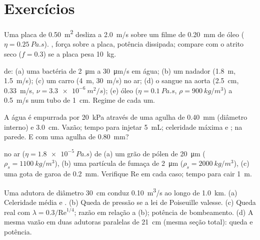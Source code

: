 \section{Exercícios}

\begin{exercise}[$\star$]\label{exo:b2:viscous-flows:1}
Uma placa de \qty{0.50}{m^2} desliza a \qty{2.0}{m/s} sobre um filme de \qty{0.20}{mm} de óleo
($\eta = \qty{0.25}{Pa.s}$). , força sobre a placa, potência
dissipada; compare com o atrito seco ($f = 0.3$) se a placa pesa
\qty{10}{kg}.
\end{exercise}

\begin{exercise}[$\star$]\label{exo:b2:viscous-flows:2}
 de: (a) uma bactéria de \qty{2}{\micro m} a \qty{30}{\micro m/s} em
água; (b) um nadador (\qty{1.8}{m}, \qty{1.5}{m/s}); (c) um carro (\qty{4}{m},
\qty{30}{m/s}) no ar; (d) o sangue na aorta (\qty{2.5}{cm}, \qty{0.33}{m/s},
$\nu = \qty{3.3e-6}{m^2/s}$); (e) óleo ($\eta = \qty{0.1}{Pa.s}$, $\rho =
\qty{900}{kg/m^3}$) a \qty{0.5}{m/s} num tubo de \qty{1}{cm}. Regime de cada um.
\end{exercise}

\begin{exercise}[$\star$]\label{exo:b2:viscous-flows:3}
A água é empurrada por \qty{20}{kPa} através de uma agulha de \qty{0.40}{mm} (diâmetro interno)
e \qty{3.0}{cm}. Vazão; tempo para injetar \qty{5}{mL}; celeridade máxima
e ;  na parede. E com uma agulha de \qty{0.80}{mm}?
\end{exercise}

\begin{exercise}[$\star$]\label{exo:b2:viscous-flows:4}
 no ar ($\eta = \qty{1.8e-5}{Pa.s}$) de (a) um grão de pólen de \qty{20}{\micro m}
($\rho_s = \qty{1100}{kg/m^3}$), (b) uma partícula de fumaça de \qty{2}{\micro m}
($\rho_s = \qty{2000}{kg/m^3}$), (c) uma gota de garoa de \qty{0.2}{mm}.
Verifique $\mathrm{Re}$ em cada caso; tempo para cair \qty{1}{m}.
\end{exercise}

\begin{exercise}[$\star\star$]\label{exo:b2:viscous-flows:5}
Uma adutora de diâmetro \qty{30}{cm} conduz \qty{0.10}{m^3/s} ao longo de
\qty{1.0}{km}. (a) Celeridade média e . (b) Queda de pressão se
a lei de Poiseuille valesse. (c) Queda real com $\lambda = 0.3/\mathrm{Re}^{1/4}$;
razão em relação a (b); potência de bombeamento. (d) A mesma vazão em duas adutoras
paralelas de \qty{21}{cm} (mesma seção total): queda e potência.
\end{exercise}

